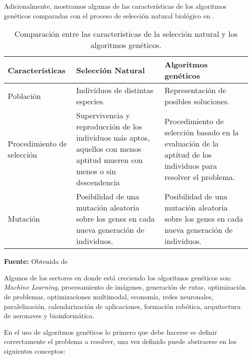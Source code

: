 \documentclass[10pt,twocolumn,a4paper]{articuloAPA}
\begin{document}
Adicionalmente, mostramos algunas de las características de los algoritmos genéticos comparadas con el proceso de selección natural biológico en .

\begin{table}
	\scriptsize
	\centering
	\begin{threeparttable}
		\caption{Comparación entre las características de la selección natural y los algoritmos genéticos.\vspace*{-5pt}}
		\label{tab:selecvsga}
		\begin{tabular}{p{0.2\tablelength}|p{0.4\tablelength}p{0.4\tablelength}}
			\hline
          Características
        & Selección Natural
        & Algoritmos genéticos \\
			\hline
          Población
        & Individuos de distintas especies.
        & Representación de posibles soluciones. \\

          Procedimiento de selección 
        & Supervivencia y reproducción de los individuos más aptos, aquellos con menos aptitud mueren con menos o sin descendencia 
        & Procedimiento de selección basado en la evaluación de la aptitud de los individuos para resolver el problema. \\

           Mutación 
        & Posibilidad de una mutación aleatoria sobre los genes en cada nueva generación de individuos. 
        & Posibilidad de una mutación aleatoria sobre los genes en cada nueva generación de individuos. \\
			\hline
		\end{tabular}
		\begin{tablenotes}
			\item {\scriptsize \textbf{Fuente:} Obtenida de \textcite{alfaro2021}}
		\end{tablenotes}
		\end{threeparttable}
	\end{table}	


Algunos de los sectores en donde está creciendo los algoritmos genéticos son: \textit{Machine Learning}, procesamiento de imágenes, generación de rutas, optimización de problemas, optimizaciones multimodal, economía, redes neuronales, paralelización, calendarización de aplicaciones, formación robótica, arquitectura de aeronaves y bioinformática.

En el uso de algoritmos genéticos lo primero que debe hacerse es definir correctamente el problema a resolver, una vez definido puede abstraerse en los siguientes conceptos:
\end{document}
